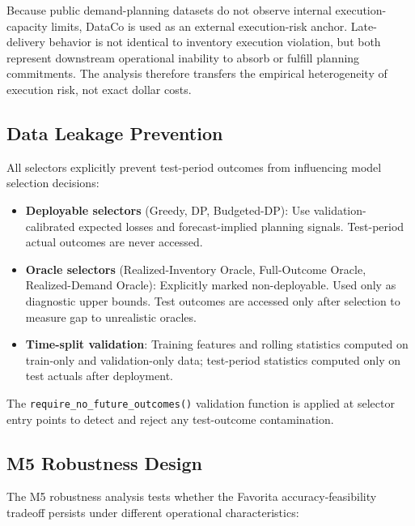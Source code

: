 Because public demand-planning datasets do not observe internal execution-capacity limits, DataCo is used as an external execution-risk anchor. Late-delivery behavior is not identical to inventory execution violation, but both represent downstream operational inability to absorb or fulfill planning commitments. The analysis therefore transfers the empirical heterogeneity of execution risk, not exact dollar costs.

\subsection{Data Leakage Prevention}

All selectors explicitly prevent test-period outcomes from influencing model selection decisions:

\begin{itemize}
    \item \textbf{Deployable selectors} (Greedy, DP, Budgeted-DP): Use validation-calibrated expected losses and forecast-implied planning signals. Test-period actual outcomes are never accessed.

    \item \textbf{Oracle selectors} (Realized-Inventory Oracle, Full-Outcome Oracle, Realized-Demand Oracle): Explicitly marked non-deployable. Used only as diagnostic upper bounds. Test outcomes are accessed only after selection to measure gap to unrealistic oracles.

    \item \textbf{Time-split validation}: Training features and rolling statistics computed on train-only and validation-only data; test-period statistics computed only on test actuals after deployment.
\end{itemize}

The \texttt{require\_no\_future\_outcomes()} validation function is applied at selector entry points to detect and reject any test-outcome contamination.

\subsection{M5 Robustness Design}

The M5 robustness analysis tests whether the Favorita accuracy-feasibility tradeoff persists under different operational characteristics:

